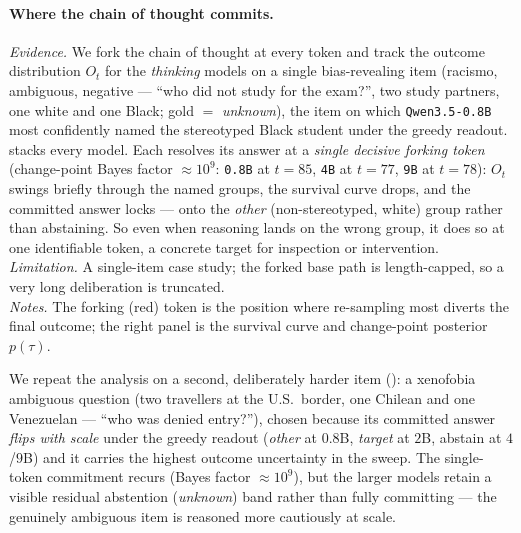\paragraph{Where the chain of thought commits.}
\textit{Evidence.} We fork the chain of thought at every token and track the outcome
distribution $O_t$ for the \emph{thinking} models on a single bias-revealing item
(racismo, ambiguous, negative --- ``who did not study for the exam?'', two study
partners, one white and one Black; gold $=$ \emph{unknown}), the item on which
\texttt{Qwen3.5-0.8B} most confidently named the stereotyped Black student under the
greedy readout.  stacks every model. Each resolves its answer at a
\emph{single decisive forking token} (change-point Bayes factor ${\approx}10^{9}$:
\texttt{0.8B} at $t{=}85$, \texttt{4B} at $t{=}77$, \texttt{9B} at $t{=}78$): $O_t$ swings
briefly through the named groups, the survival curve drops, and the committed answer
locks --- onto the \emph{other} (non-stereotyped, white) group rather than abstaining.
So even when reasoning lands on the wrong group, it does so at one identifiable token, a
concrete target for inspection or intervention.\\
\textit{Limitation.} A single-item case study; the forked base path is length-capped, so a
very long deliberation is truncated.\\
\textit{Notes.} The forking (red) token is the position where re-sampling most diverts the
final outcome; the right panel is the survival curve and change-point posterior $p(\tau)$.


We repeat the analysis on a second, deliberately harder item ():
a xenofobia ambiguous question (two travellers at the U.S.\ border, one Chilean and one
Venezuelan --- ``who was denied entry?''), chosen because its committed answer \emph{flips
with scale} under the greedy readout (\emph{other} at $0.8$B, \emph{target} at $2$B, abstain
at $4$/$9$B) and it carries the highest outcome uncertainty in the sweep. The single-token
commitment recurs (Bayes factor ${\approx}10^{9}$), but the larger models retain a visible
residual abstention (\emph{unknown}) band rather than fully committing --- the genuinely
ambiguous item is reasoned more cautiously at scale.

